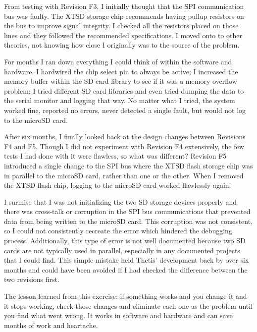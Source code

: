 From testing with Revision F3, I initially thought that the SPI communication bus was faulty.
The XTSD storage chip recommends having pullup resistors on the bus to improve signal integrity.
I checked all the resistors placed on those lines and they followed the recommended specifications.
I moved onto to other theories, not knowing how close I originally was to the source of the problem.

For months I ran down everything I could think of within the software and hardware.
I hardwired the chip select pin to always be active;
I increased the memory buffer within the SD card library to see if it was a memory overflow problem;
I tried different SD card libraries and even tried dumping the data to the serial monitor and logging that way.
No matter what I tried, the system worked fine, reported no errors, never detected a single fault, but would not log to the microSD card.

After six months, I finally looked back at the design changes between Revisions F4 and F5.
Though I did not experiment with Revision F4 extensively, the few tests I had done with it were flawless, so what was different?
Revision F5 introduced a single change to the SPI bus where the XTSD flash storage chip was in parallel to the microSD card, rather than one or the other.
When I removed the XTSD flash chip, logging to the microSD card worked flawlessly again!

I surmise that I was not initializing the two SD storage devices properly and there was cross-talk or corruption in the SPI bus communications that prevented data from being written to the microSD card.
This corruption was not consistent, so I could not consistently recreate the error which hindered the debugging process.
Additionally, this type of error is not well documented because two SD cards are not typically used in parallel, especially in any documented projects that I could find.
This simple mistake held Thetis' development back by over six months and could have been avoided if I had checked the difference between the two revisions first.

The lesson learned from this exercise: if something works and you change it and it stops working, check those changes and eliminate each one as the problem until you find what went wrong.
It works in software and hardware and can save months of work and heartache.